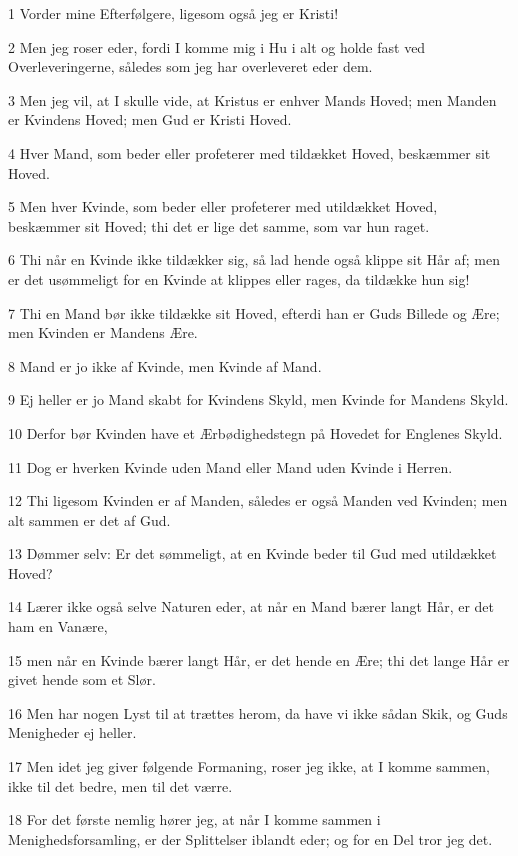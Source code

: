 \par 1 Vorder mine Efterfølgere, ligesom også jeg er Kristi!
\par 2 Men jeg roser eder, fordi I komme mig i Hu i alt og holde fast ved Overleveringerne, således som jeg har overleveret eder dem.
\par 3 Men jeg vil, at I skulle vide, at Kristus er enhver Mands Hoved; men Manden er Kvindens Hoved; men Gud er Kristi Hoved.
\par 4 Hver Mand, som beder eller profeterer med tildækket Hoved, beskæmmer sit Hoved.
\par 5 Men hver Kvinde, som beder eller profeterer med utildækket Hoved, beskæmmer sit Hoved; thi det er lige det samme, som var hun raget.
\par 6 Thi når en Kvinde ikke tildækker sig, så lad hende også klippe sit Hår af; men er det usømmeligt for en Kvinde at klippes eller rages, da tildække hun sig!
\par 7 Thi en Mand bør ikke tildække sit Hoved, efterdi han er Guds Billede og Ære; men Kvinden er Mandens Ære.
\par 8 Mand er jo ikke af Kvinde, men Kvinde af Mand.
\par 9 Ej heller er jo Mand skabt for Kvindens Skyld, men Kvinde for Mandens Skyld.
\par 10 Derfor bør Kvinden have et Ærbødighedstegn på Hovedet for Englenes Skyld.
\par 11 Dog er hverken Kvinde uden Mand eller Mand uden Kvinde i Herren.
\par 12 Thi ligesom Kvinden er af Manden, således er også Manden ved Kvinden; men alt sammen er det af Gud.
\par 13 Dømmer selv: Er det sømmeligt, at en Kvinde beder til Gud med utildækket Hoved?
\par 14 Lærer ikke også selve Naturen eder, at når en Mand bærer langt Hår, er det ham en Vanære,
\par 15 men når en Kvinde bærer langt Hår, er det hende en Ære; thi det lange Hår er givet hende som et Slør.
\par 16 Men har nogen Lyst til at trættes herom, da have vi ikke sådan Skik, og Guds Menigheder ej heller.
\par 17 Men idet jeg giver følgende Formaning, roser jeg ikke, at I komme sammen, ikke til det bedre, men til det værre.
\par 18 For det første nemlig hører jeg, at når I komme sammen i Menighedsforsamling, er der Splittelser iblandt eder; og for en Del tror jeg det.
